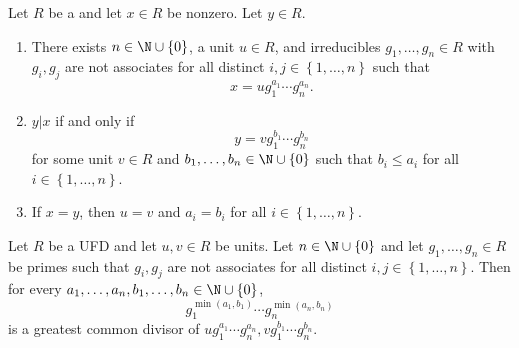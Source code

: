 \documentclass[pmath347]{subfiles}
\begin{document}
    \begin{prop}{}
        Let $R$ be a and let $x\in R$ be nonzero. Let $y\in R$.
        \begin{enumerate}
            \item There exists $n\in\N\cup\left\lbrace 0 \right\rbrace $, a unit $u\in R$, and irreducibles $g_1,\ldots,g_n\in R$ with $g_i,g_j$ are not associates for all distinct $i,j\in\left\lbrace 1,\ldots,n \right\rbrace$ such that
                \begin{equation*}
                    x = ug_1^{a_1}\cdots g_n^{a_n}.
                \end{equation*}
            \item $y|x$ if and only if
                \begin{equation*}
                    y = vg_1^{b_1}\cdots g_n^{b_n}
                \end{equation*}
                for some unit $v\in R$ and $b_1,\ldots,b_n\in\N\cup\left\lbrace 0 \right\rbrace$ such that $b_i\leq a_i$ for all $i\in\left\lbrace 1,\ldots,n \right\rbrace$. 
            \item If $x=y$, then $u=v$ and $a_i=b_i$ for all $i\in\left\lbrace 1,\ldots,n \right\rbrace$.
        \end{enumerate}
    \end{prop}

    \begin{prop}{}
        Let $R$ be a UFD and let $u,v\in R$ be units. Let $n\in\N\cup\left\lbrace 0 \right\rbrace$ and let $g_1,\ldots,g_n\in R$ be primes such that $g_i,g_j$ are not associates for all distinct $i,j\in\left\lbrace 1,\ldots,n \right\rbrace$. Then for every $a_1,\ldots,a_n,b_1,\ldots,b_n\in\N\cup\left\lbrace 0 \right\rbrace$,
        \begin{equation*}
            g_1^{\min\left( a_1,b_1 \right) }\cdots g_n^{\min\left( a_n,b_n \right) }
        \end{equation*}
        is a greatest common divisor of $ug_1^{a_1}\cdots g_n^{a_n}, vg_1^{b_1}\cdots g_n^{b_n}$.
    \end{prop}
\end{document}
